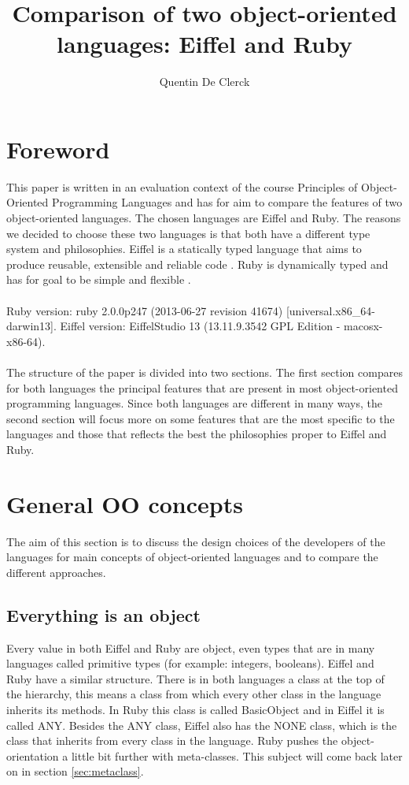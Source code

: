 \documentclass[12pt,a4paper,twocolumn]{article}
\title{Comparison of two object-oriented languages: Eiffel and Ruby}
\author{Quentin De Clerck}
\begin{document}
\maketitle
\tableofcontents
\section{Foreword}
This paper is written in an evaluation context of the course Principles of Object-Oriented Programming Languages and has for aim to compare the features of two object-oriented languages. The chosen languages are Eiffel and Ruby. The reasons we decided to choose these two languages is that both have a different type system and philosophies. Eiffel is a statically typed language that aims to produce reusable, extensible and reliable code \cite{meyer2001eiffel}. Ruby is dynamically typed and has for goal to be simple and flexible \cite{rubyAbout}. 
\\
\\
Ruby version: ruby 2.0.0p247 (2013-06-27 revision 41674) [universal.x86\_64-darwin13].
Eiffel version:  EiffelStudio 13 (13.11.9.3542 GPL Edition - macosx-x86-64).
\\
\\
The structure of the paper is divided into two sections. The first section compares for both languages the principal features that are present in most object-oriented programming languages. Since both languages are different in many ways, the second section will focus more on some features that are the most specific to the languages and those that reflects the best the philosophies proper to Eiffel and Ruby. 
\section{General OO concepts}
The aim of this section is to discuss the design choices of the developers of the languages for main concepts of object-oriented languages and to compare the different approaches. 
\subsection{Everything is an object}
Every value in both Eiffel and Ruby are object, even types that are in many languages called primitive types (for example: integers, booleans). Eiffel and Ruby have a similar structure. There is in both languages a class at the top of the hierarchy, this means a class from which every other class in the language inherits its methods. In Ruby this class is called BasicObject\cite{basicObjectDoc} and in Eiffel it is called ANY\cite{meyer2001eiffel}. Besides the ANY class, Eiffel also has the NONE class, which is the class that inherits from every class in the language. Ruby pushes the object-orientation a little bit further with meta-classes. This subject will come back later on in section \ref{sec:metaclass}.
\end{document}
